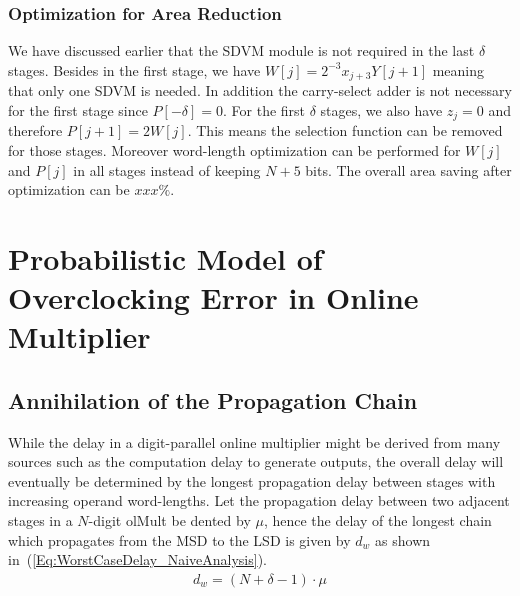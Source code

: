 \documentclass[a4paper, 11pt]{article}
\begin{document}
\subsubsection{Optimization for Area Reduction}
We have discussed earlier that the SDVM module is not required in the last $\delta$ stages. Besides in the first stage, we have $W[j] = 2^{-3}x_{j+3}Y[j+1]$ meaning that only one SDVM is needed. In addition the carry-select adder is not necessary for the first stage since $P[-\delta]=0$. For the first $\delta$ stages, we also have $z_j=0$ and therefore $P[j+1]=2W[j]$. This means the selection function can be removed for those stages. Moreover word-length optimization can be performed for $W[j]$ and $P[j]$ in all stages instead of keeping $N+5$ bits. The overall area saving after optimization can be $xxx\%$.





\section{Probabilistic Model of Overclocking Error in Online Multiplier}
\subsection{Annihilation of the Propagation Chain}\label{subSec:AnnihilationOfChain}

While the delay in a digit-parallel online multiplier might be derived from many sources such as the computation delay to generate outputs, the overall delay will eventually be determined by the longest propagation delay between stages with increasing operand word-lengths. Let the propagation delay between two adjacent stages in a $N$-digit olMult be dented by $\mu$, hence the delay of the longest chain which propagates from the MSD to the LSD is given by $d_w$ as shown in~(\ref{Eq:WorstCaseDelay_NaiveAnalysis}).
\begin{eqnarray}\label{Eq:WorstCaseDelay_NaiveAnalysis}
  d_w = (N+\delta-1)\cdot \mu
\end{eqnarray}
\end{document}
